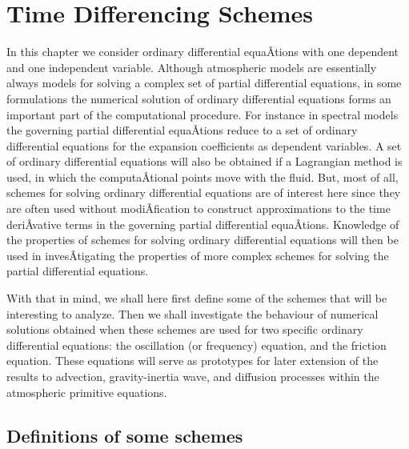 

\section{Time Differencing Schemes}\label{Chapter2}

In this chapter we consider ordinary differential equaÂ­tions with one
dependent and one independent variable. Although atmospheric models are
essentially always models for solving a complex set of partial
differential equations, in some formulations the numerical solution of
ordinary differential equations forms an important part of the
computational procedure. For instance in spectral models the governing
partial differential equaÂ­tions reduce to a set of ordinary differential
equations for the expansion coefficients as dependent variables. A set
of ordinary differential equations will also be obtained if a Lagrangian
method is used, in which the computaÂ­tional points move with the fluid.
But, most of all, schemes for solving ordinary differential equations
are of interest here since they are often used without modiÂ­fication to
construct approximations to the time deriÂ­vative terms in the governing
partial differential equaÂ­tions. Knowledge of the properties of schemes
for solving ordinary differential equations will then be used in
invesÂ­tigating the properties of more complex schemes for solving the
partial differential equations.

With that in mind, we shall here first define some of the schemes that
will be interesting to analyze. Then we shall investigate the behaviour
of numerical solutions obtained when these schemes are used for two
specific ordinary differential equations: the oscillation (or frequency)
equation, and the friction equation. These equations will serve as
prototypes for later extension of the results to advection,
gravity-inertia wave, and diffusion processes within the atmospheric
primitive equations.

\subsection{\texorpdfstring{\textbf{Definitions of some
schemes}}{Definitions of some schemes}}\label{Section2.1}

